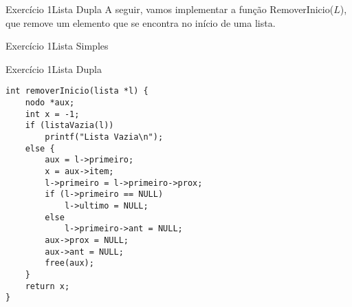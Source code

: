 \documentclass[aspectratio=169]{beamer}
\begin{document}

\begin{frame}[fragile]{Exercício 1}{Lista Dupla}
A seguir, vamos implementar a função RemoverInicio($L$), que remove um elemento que se encontra no início de uma lista.
\end{frame}


\begin{frame}[fragile]{Exercício 1}{Lista Simples}
\end{frame}


\begin{frame}[fragile]{Exercício 1}{Lista Dupla}
\begin{lstlisting}[style=CStyle]
int removerInicio(lista *l) {
    nodo *aux;
    int x = -1;
    if (listaVazia(l))
        printf("Lista Vazia\n");
    else {
        aux = l->primeiro;
        x = aux->item;
        l->primeiro = l->primeiro->prox;
        if (l->primeiro == NULL) 
            l->ultimo = NULL;
        else 
            l->primeiro->ant = NULL;
        aux->prox = NULL;
        aux->ant = NULL;
        free(aux);                  
    }
    return x;
}
\end{lstlisting}  
\end{frame}
\end{document}
